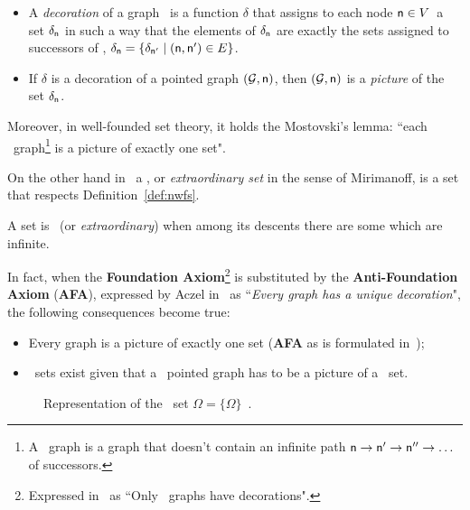 	\begin{definition} 
		\begin{itemize}
			\item A \emph{decoration} of a graph \ is a function $\delta$ that assigns to each node $\mathsf{n} \in V$\ a set $\delta_{\mathsf{n}}$ in such a way that the elements of $\delta_{\mathsf{n}}$ are exactly the sets assigned to successors of , \ie $\delta_{\mathsf{n}} = \{\delta_{\mathsf{n^{\prime}}} \mid (\mathsf{n},\mathsf{n}^\prime) \in E\}$.
		
			\item If $\delta$ is a decoration of a pointed graph $(\mathcal{G}, \mathsf{n})$, then $(\mathcal{G}, \mathsf{n})$ is a \emph{picture} of the set $\delta_{\mathsf{n}}$.
		\end{itemize}
	\end{definition}
	Moreover, in well-founded set theory, it holds the Mostovski's lemma: \textquotedblleft each \wf\ graph\footnote{A \wf\ graph is a graph that doesn't contain an infinite path $\mathsf{n} \rightarrow \mathsf{n}^{\prime} \rightarrow \mathsf{n}^{\prime\prime} \rightarrow \dots$ of successors.} is a picture of exactly one set".

	
	On the other hand in~\cite{Aczel1989-ACZNS-2} a \emph{\nwf}, or \emph{extraordinary set} in the sense of Mirimanoff, is a set that respects Definition~\ref{def:nwfs}.
	\begin{definition}\label{def:nwfs}
		A set is \emph{\nwf}\ (or \emph{extraordinary}) when among its descents there are some which are infinite.
	\end{definition}
	In fact, when the \textbf{Foundation Axiom}\footnote{Expressed in~\cite{gerbrandy1999bisimulations} as \textquotedblleft Only \wf\ graphs have decorations".} is substituted by the \textbf{Anti-Foundation Axiom} (\textbf{AFA}), expressed by Aczel in~\cite{Aczel1989-ACZNS-2} as \textquotedblleft \textit{Every graph has a unique decoration}", the following consequences become true:
	\begin{itemize}
			\item Every graph is a picture of exactly one set (\textbf{AFA} as is formulated in~\cite{gerbrandy1999bisimulations});
		\item \nwf\ sets exist given that a \nwf\ pointed graph has to be a picture of a \nwf\ set.
	\end{itemize}
	\begin{figure}
		\centering
		\hfill
		\caption{Representation of the \nwf\ set $\Omega = \{\Omega\}$~\cite{Aczel1989-ACZNS-2}.}
		\label{fig:omega_nwf}
	\end{figure}


